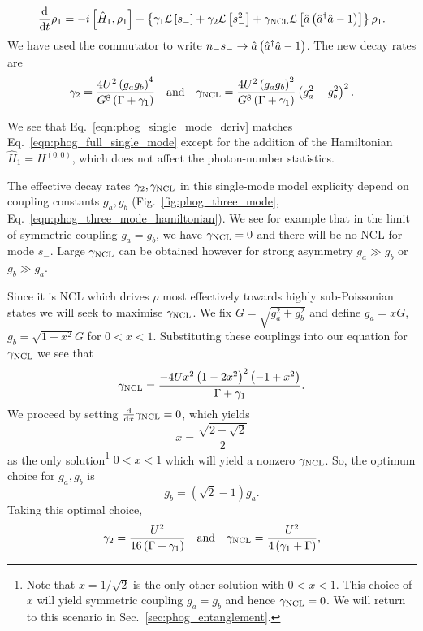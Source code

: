\begin{equation}\label{eqn:phog_single_mode_deriv}
\frac{\mathrm{d}}{\mathrm{d}t} \rho_1 = - i \left[\hat{H}_1, \rho_1\right] + \left\{\gamma_1 \mathcal{L}\left[s_-\right] + \gamma_2 \mathcal{L}\left[s_-^2\right] + \gamma_{\text{NCL}} \mathcal{L}\left[\hat{a}\left(\hat{a}^\dagger \hat{a} - 1\right)\right] \right\}\rho_1.
\end{equation}
We have used the commutator to write $n_- s_- \rightarrow \hat{a}\left(\hat{a}^\dagger \hat{a} - 1\right)$. The new decay rates are
\begin{equation}\label{eqn:phog_single_mode_decay_rates}
\gamma_2 = \frac{4 U^2 \left(g_a g_b\right)^4}{G^8 \left(\Gamma + \gamma_1\right)} \qq{and} \gncl = \frac{4 U^2 \left(g_a g_b\right)^2}{G^8 \left(\Gamma + \gamma_1\right)}\left(g_a^2 - g_b^2\right)^2.
\end{equation}

\noindent We see that Eq.~\ref{eqn:phog_single_mode_deriv} matches Eq.~\ref{eqn:phog_full_single_mode} except for the addition of the Hamiltonian $\hat{H}_1 = H^{\left(0, 0\right)}$, which does not affect the photon-number statistics. 



The effective decay rates $\gamma_2, \gamma_{\text{NCL}}$ in this single-mode model explicity depend on coupling constants $g_a, g_b$ (Fig.~\ref{fig:phog_three_mode}, Eq.~\ref{eqn:phog_three_mode_hamiltonian}). We see for example that in the limit of symmetric coupling $g_a = g_b$, we have $\gamma_{\text{NCL}} = 0$ and there will be no NCL for mode $s_-$. Large $\gamma_{\text{NCL}}$ can be obtained however for strong asymmetry $g_a \gg g_b$ or $g_b \gg g_a$. 

Since it is NCL which drives $\rho$ most effectively towards highly sub-Poissonian states we will seek to maximise $\gamma_{\text{NCL}}$. We fix $G = \sqrt{g_a^2 + g_b^2}$ and define $g_a = x G$,$ g_b = \sqrt{1-x^2}G$ for $0 < x < 1$. Substituting these couplings into our equation for $\gamma_{\text{NCL}}$ we see that
\begin{equation}
\gamma_{\text{NCL}} = \frac{- 4 U x^2 \left(1 - 2 x^2\right)^2 \left(-1 + x^2\right)}{\Gamma + \gamma_1}.
\end{equation}
We proceed by setting $\frac{\mathrm{d}}{\mathrm{d}x} \gamma_{\text{NCL}} = 0$, which yields
\begin{equation}
x = \frac{\sqrt{2 + \sqrt{2}}}{2}
\end{equation}
as the only solution\footnote{Note that $x = 1/\sqrt{2}$ is the only other solution with $0 < x < 1$. This choice of $x$ will yield symmetric coupling $g_a = g_b$ and hence $\gamma_{\text{NCL}}=0$. We will return to this scenario in Sec.~\ref{sec:phog_entanglement}.} $0 < x < 1$ which will yield a nonzero $\gamma_{\text{NCL}}$. So, the optimum choice for $g_a, g_b$ is
\begin{equation}\label{eqn:phog_gagb_optimal}
g_b = \left(\sqrt{2} - 1\right)g_a.
\end{equation}
Taking this optimal choice,
\begin{equation}\label{eqn:phog_gamma3_optimal}
\gamma_2 = \frac{U^2}{16\left(\Gamma + \gamma_1\right)} \qq{and} \gncl = \frac{U^2}{4 \left(\gamma_1 + \Gamma\right)},
\end{equation}

